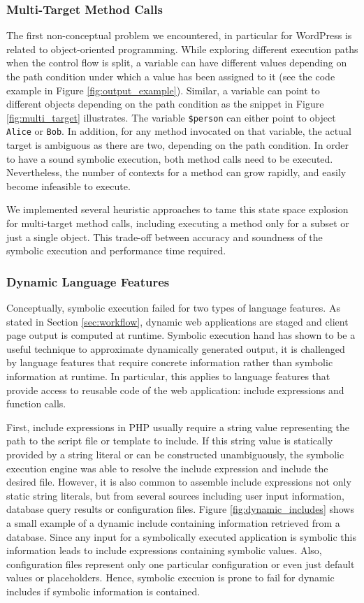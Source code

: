 \documentclass[sigconf]{acmart}
\renewcommand{\sf}[1]{\textsf{#1}}
\renewcommand{\tt}[1]{\texttt{#1}}
\begin{document}
\subsubsection{Multi-Target Method Calls}
The first non-conceptual problem we encountered, in particular for
\sf{WordPress} is related to object-oriented programming. While exploring
different execution paths when the control flow is split, a variable can have
different values depending on the path condition under which a value has been
assigned to it (see the code example in Figure \ref{fig:output_example}). Similar, a variable
can point to different objects depending on the path condition as the snippet in
Figure \ref{fig:multi_target} illustrates. The variable \tt{\$person} can either
point to object \tt{Alice} or \tt{Bob}. In addition, for any method invocated on
that variable, the actual target is ambiguous as there are two, depending on the
path condition. In order to have a sound symbolic execution, both method calls
need to be executed. Nevertheless, the number of contexts for a method can grow
rapidly, and easily become infeasible to execute.

We implemented several heuristic approaches to tame this state space explosion
for multi-target method calls, including executing a method only for a subset or
just a single object. This trade-off between accuracy and soundness
of the symbolic execution and performance time required.

\subsubsection{Dynamic Language Features}
Conceptually, symbolic execution failed for two types of language features. As
stated in Section \ref{sec:workflow}, dynamic web applications are staged and client page
output is computed at runtime. Symbolic execution hand has shown to be a useful
technique to approximate dynamically generated output, it is challenged by
language features that require concrete information rather than symbolic
information at runtime. In particular, this applies to language features that
provide access to reusable code of the web application: include expressions and
function calls.

First, include expressions in PHP usually require a string value representing
the path to the script file or template to include. If this string value is
statically provided by a string literal or can be constructed unambiguously, the
symbolic execution engine was able to resolve the include expression and include
the desired file. However, it is also common to assemble include expressions not
only static string literals, but from several sources including user input
information, database query results or configuration files. Figure
\ref{fig:dynamic_includes} shows a small example of a dynamic include containing
information retrieved from a database. Since any input for a symbolically
executed application is symbolic this information leads to include expressions
containing symbolic values. Also, configuration files represent only one
particular configuration or even just default values or placeholders. Hence, 
symbolic execuion is prone to fail for dynamic includes if symbolic information
is contained.
\end{document}
